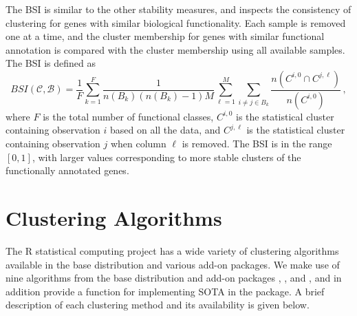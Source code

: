 \documentclass[11pt]{article}
\begin{document}
The BSI is similar to the other stability
measures, and inspects the consistency of clustering for genes with
similar biological functionality.  Each sample is removed one at a
time, and the cluster membership for genes with similar functional annotation
is compared with the cluster membership using all available samples.
The BSI is defined as 
$$
BSI(\mathcal{C}, \mathcal{B}) = \frac{1}{F}\sum\limits_{k=1}^F
\frac{1}{n(B_k)(n(B_k)-1)M} \sum\limits_{\ell=1}^M \sum\limits_{i\neq j\in
    B_k} \frac{n(C^{i,0} \cap C^{j,\ell})}{n(C^{i,0})}\,,
$$
where $F$ is the total number of functional classes, $C^{i,0}$ is the statistical cluster containing observation $i$
based on all the data, and $C^{j,\ell}$ is the statistical cluster
containing observation $j$ when column $\ell$ is removed.  The BSI is
in the range $[0,1]$, with larger values corresponding to more stable
clusters of the functionally annotated genes.






\section{Clustering Algorithms}
\label{sec:clustering}

The R statistical computing project \citep{R} has a wide variety of
clustering algorithms available in the base distribution and various
add-on packages.  We make use of nine algorithms from the base
distribution and add-on packages  \citep{cluster, Kau1990},  \citep{kohonen}, and
 \citep{mclust, Fra2003}, and in addition provide a function for implementing
SOTA in the  package.
A brief description of each clustering method and its availability is
given below.



\end{document}

